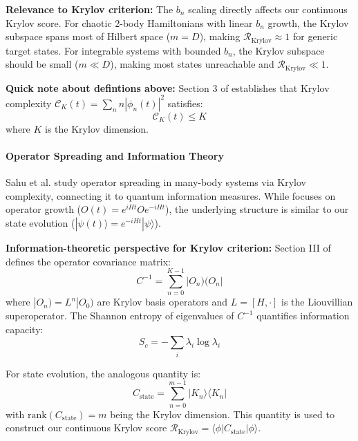 \documentclass[ a4paper, 
                amsfonts, 
                amssymb, 
                amsmath, 
                reprint, 
                showkeys, 
                nofootinbib,
                superscriptaddress, 
                onecolumn, 
                notitlepage,
                aps,
                pra,
                longbibliography]{revtex4-1}
\theoremstyle{definition}
\begin{document}
\textbf{Relevance to Krylov criterion:} The $b_n$ scaling directly affects our continuous Krylov score. For chaotic 2-body Hamiltonians with linear $b_n$ growth, the Krylov subspace spans most of Hilbert space ($m = D$), making $\mathcal{R}_{\text{Krylov}} \approx 1$ for generic target states. For integrable systems with bounded $b_n$, the Krylov subspace should be small ($m \ll D$), making most states unreachable and $\mathcal{R}_{\text{Krylov}} \ll 1$.

\textbf{Quick note about defintions above:} 
Section 3 of \cite{Nandy_2025} establishes that Krylov complexity $\mathcal{C}_K(t) = \sum_n n |\phi_n(t)|^2$ satisfies:
\begin{equation}
\mathcal{C}_K(t) \leq K
\end{equation}
where $K$ is the Krylov dimension. 

\paragraph{Operator Spreading and Information Theory}

Sahu et al. \cite{Sahu_2023} study operator spreading in many-body systems via Krylov complexity, connecting it to quantum information measures. While \cite{Sahu_2023} focuses on operator growth ($O(t) = e^{iHt} O e^{-iHt}$), the underlying structure is similar to our state evolution ($|\psi(t)\rangle = e^{-iHt}|\psi\rangle$). 

\textbf{Information-theoretic perspective for Krylov criterion:} Section III of \cite{Sahu_2023} defines the operator covariance matrix:
\begin{equation}
C^{-1} = \sum_{n=0}^{K-1} |O_n)(O_n| 
\end{equation}
where $|O_n) = L^n |O_0)$ are Krylov basis operators and $L = [H, \cdot]$ is the Liouvillian superoperator. The Shannon entropy of eigenvalues of $C^{-1}$ quantifies information capacity:
\begin{equation}
S_c = -\sum_i \lambda_i \log \lambda_i
\end{equation}

For state evolution, the analogous quantity is:
\begin{equation}
C_{\text{state}} = \sum_{n=0}^{m-1} |K_n\rangle\langle K_n|
\end{equation}
with $\text{rank}(C_{\text{state}}) = m$ being the Krylov dimension. This quantity is used to construct our continuous Krylov score $\mathcal{R}_{\text{Krylov}} = \langle \phi | C_{\text{state}} | \phi \rangle$.
\end{document}
